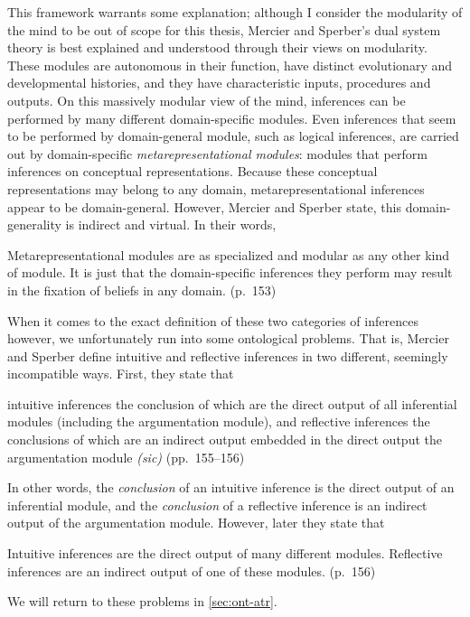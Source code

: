 This framework warrants some explanation; although I consider the modularity of the mind to be out of scope for this thesis, Mercier and Sperber's dual system theory is best explained and understood through their views on modularity.
These modules are autonomous in their function, have distinct evolutionary and developmental histories, and they have characteristic inputs, procedures and outputs.
On this massively modular view of the mind, inferences can be performed by many different domain-specific modules. Even inferences that seem to be performed by domain-general module, such as logical inferences, are carried out by domain-specific \emph{metarepresentational modules}: modules that perform inferences on conceptual representations.
Because these conceptual representations may belong to any domain, metarepresentational inferences appear to be domain-general. However, Mercier and Sperber state, this domain-generality is indirect and virtual. In their words,
\begin{quoting}
    Metarepresentational modules are as specialized and modular as any other kind of module. It is just that the domain-specific inferences they perform may result in the fixation of beliefs in any domain.
    \hfill (p.~153)
\end{quoting}

When it comes to the exact definition of these two categories of inferences however, we unfortunately run into some ontological problems.
That is, Mercier and Sperber define intuitive and reflective inferences in two different, seemingly incompatible ways. First, they state that
\begin{quoting}
    intuitive inferences the conclusion of which are the direct output of all inferential modules (including the argumentation module), and reflective inferences the conclusions of which are an indirect output embedded in the direct output the argumentation module \emph{(sic)}
    \hfill (pp.~155--156)
\end{quoting}
In other words, the \emph{conclusion} of an intuitive inference is the direct output of an inferential module, and the \emph{conclusion} of a reflective inference is an indirect output of the argumentation module. However, later they state that
\begin{quoting}
    Intuitive inferences are the direct output of many different modules. Reflective inferences are an indirect output of one of these modules.
    \hfill (p.~156)
\end{quoting}
We will return to these problems in \cref{sec:ont-atr}.


